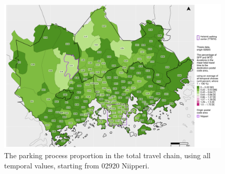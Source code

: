 \begin{figure}[H]%
    \centering
    \includegraphics[trim={0.9cm 0.3cm 0.25cm 0.3cm},clip,width=\textwidth]{images/compare_traveltimes_mapfill-msc_all_pct_fromzip-02920_28-09-2020.png}
    \caption[Parking process proportion from Niipperi, all temporal values]{The parking process proportion in the total travel chain, using all temporal values, starting from 02920 Niipperi.}%
    \label{fig:compare_msc_all_pct_02920}%
\end{figure}